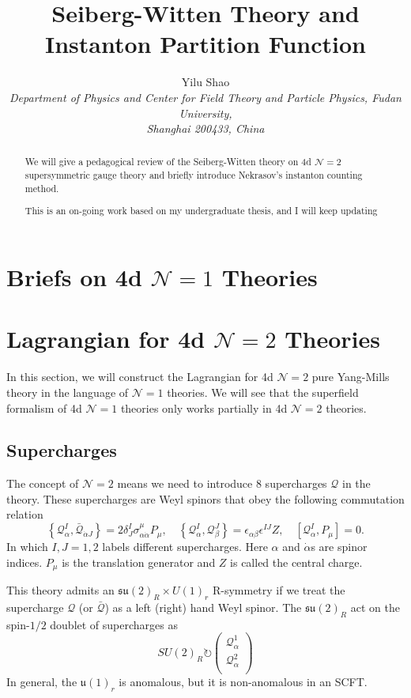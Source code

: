 \documentclass{article}
\title{Seiberg-Witten Theory and Instanton Partition Function}
\author{Yilu Shao\\ \footnotesize{\it Department of Physics and Center for Field Theory and Particle Physics, Fudan University,}\\ \footnotesize{\it Shanghai 200433, China}}
\date{}
\begin{document}
\maketitle

\tableofcontents
\newpage

\begin{abstract}
We will give a pedagogical review of the Seiberg-Witten theory on 4d $\mathcal{N}=2$ supersymmetric gauge theory and briefly introduce Nekrasov's instanton counting method.

This is an on-going work based on my undergraduate thesis, and I will keep updating
\end{abstract}


\section{Briefs on 4d $\mathcal{N}=1$ Theories}

\section{Lagrangian for 4d $\mathcal{N}=2$ Theories}
In this section, we will construct the Lagrangian for 4d $\mathcal{N}=2$ pure Yang-Mills theory in the language of $\mathcal{N}=1$ theories. We will see that the superfield formalism of 4d $\mathcal{N}=1$ theories only works partially in 4d $\mathcal{N}=2$ theories.

\subsection{Supercharges}
The concept of $\mathcal{N}=2$ means we need to introduce $8$ supercharges $\mathcal{Q}$ in the theory. These supercharges are Weyl spinors that obey the following commutation relation
\begin{equation}
\left\{\mathcal{Q}_{\alpha}^{I}, \bar{\mathcal{Q}}_{\dot{\alpha} J}\right\}=2 \delta_{J}^{I} \sigma_{\alpha \dot{\alpha}}^{\mu} P_{\mu}, \quad\left\{\mathcal{Q}_{\alpha}^{I}, \mathcal{Q}_{\beta}^{J}\right\}=\epsilon_{\alpha \beta} \epsilon^{I J} Z, \quad\left[\mathcal{Q}_{\alpha}^{I}, P_{\mu}\right]=0. 
\end{equation}
In which $I,J=1,2$ labels different supercharges. Here $\alpha$ and $\dot{\alpha}$s are spinor indices. $P_{\mu}$ is the translation generator and $Z$ is called the central charge. 

This theory admits an $\mathfrak{su}(2)_R\times U(1)_r$ R-symmetry if we treat the supercharge $\mathcal{Q}$ (or $\bar{\mathcal{Q}}$) as a left (right) hand Weyl spinor. The $\mathfrak{su}(2)_R$ act on the spin-$1/2$ doublet of supercharges as
\begin{equation}
SU(2)_R\circlearrowright\begin{pmatrix}
\mathcal{Q}^1_{\alpha}\\
\mathcal{Q}^2_{\alpha}\\\end{pmatrix}
\end{equation}
In general, the $\mathfrak{u}(1)_r$ is anomalous, but it is non-anomalous in an SCFT.
\end{document}
